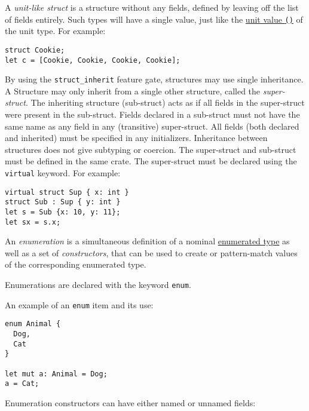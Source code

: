 \documentclass[]{article}
\begin{document}
A \emph{unit-like struct} is a structure without any fields, defined by
leaving off the list of fields entirely. Such types will have a single
value, just like the \hyperref[unit-and-boolean-literals]{unit value
\texttt{()}} of the unit type. For example:

\begin{verbatim}
struct Cookie;
let c = [Cookie, Cookie, Cookie, Cookie];
\end{verbatim}

By using the \texttt{struct\_inherit} feature gate, structures may use
single inheritance. A Structure may only inherit from a single other
structure, called the \emph{super-struct}. The inheriting structure
(sub-struct) acts as if all fields in the super-struct were present in
the sub-struct. Fields declared in a sub-struct must not have the same
name as any field in any (transitive) super-struct. All fields (both
declared and inherited) must be specified in any initializers.
Inheritance between structures does not give subtyping or coercion. The
super-struct and sub-struct must be defined in the same crate. The
super-struct must be declared using the \texttt{virtual} keyword. For
example:

\begin{verbatim}
virtual struct Sup { x: int }
struct Sub : Sup { y: int }
let s = Sub {x: 10, y: 11};
let sx = s.x;
\end{verbatim}


An \emph{enumeration} is a simultaneous definition of a nominal
\hyperref[enumerated-types]{enumerated type} as well as a set of
\emph{constructors}, that can be used to create or pattern-match values
of the corresponding enumerated type.

Enumerations are declared with the keyword \texttt{enum}.

An example of an \texttt{enum} item and its use:

\begin{verbatim}
enum Animal {
  Dog,
  Cat
}

let mut a: Animal = Dog;
a = Cat;
\end{verbatim}

Enumeration constructors can have either named or unnamed fields:
\end{document}
